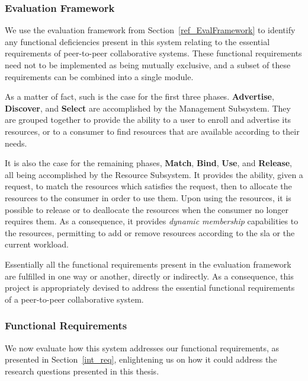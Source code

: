 \documentclass[12pt, titlepage]{uo_temp}
\begin{document}
     \subsubsection{Evaluation Framework}
     We use the evaluation framework from Section~\ref{ref_EvalFramework} to identify any
     functional deficiencies present in this system relating to the essential requirements
     of peer-to-peer collaborative systems. These functional requirements need not to be
     implemented as being mutually exclusive, and a subset of these requirements can be
     combined into a single module.

     As a matter of fact, such is the case for the first three phases. \textbf{Advertise},
     \textbf{Discover}, and \textbf{Select} are accomplished by the Management Subsystem.
     They are grouped together to provide the ability to a user to enroll and
     advertise its resources, or to a consumer to find resources that are available
     according to their needs.

     It is also the case for the remaining phases, \textbf{Match}, \textbf{Bind},
     \textbf{Use}, and \textbf{Release}, all being accomplished by the Resource
     Subsystem. It provides the ability, given a request, to match the resources which
     satisfies the request, then to allocate the resources to the consumer in order to use
     them. Upon using the resources, it is possible to release or to deallocate the
     resources when the consumer no longer requires them. As a consequence, it provides
     \emph{dynamic membership} capabilities to the resources, permitting to add or
     remove resources according to the \gls{sla} or the current workload.
     
     Essentially all the functional requirements present in the evaluation framework are
     fulfilled in one way or another, directly or indirectly. As a consequence, this
     project is appropriately devised to address the essential functional requirements of
     a peer-to-peer collaborative system.
     
     \subsubsection{Functional Requirements}
     We now evaluate how this system addresses our functional requirements, as presented in
     Section~\ref{int_req}, enlightening us on how it could address the research questions
     presented in this thesis.
     
\end{document}
